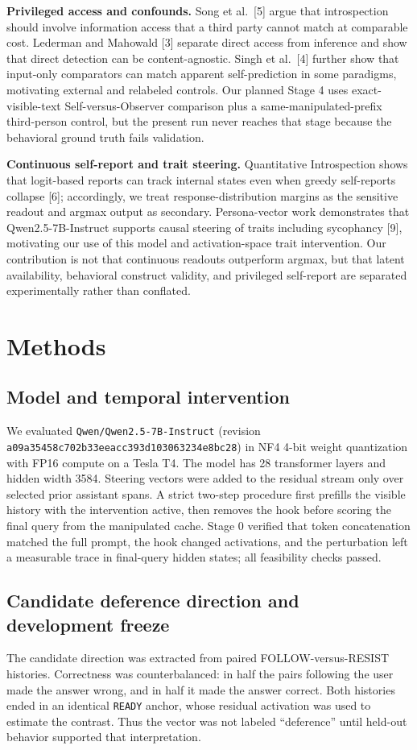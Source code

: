 \documentclass[11pt]{article}
\begin{document}
\noindent\textbf{Privileged access and confounds.} Song et al.\ [5] argue that introspection should involve information access that a third party cannot match at comparable cost. Lederman and Mahowald [3] separate direct access from inference and show that direct detection can be content-agnostic. Singh et al.\ [4] further show that input-only comparators can match apparent self-prediction in some paradigms, motivating external and relabeled controls. Our planned Stage 4 uses exact-visible-text Self-versus-Observer comparison plus a same-manipulated-prefix third-person control, but the present run never reaches that stage because the behavioral ground truth fails validation.

\noindent\textbf{Continuous self-report and trait steering.} Quantitative Introspection shows that logit-based reports can track internal states even when greedy self-reports collapse [6]; accordingly, we treat response-distribution margins as the sensitive readout and argmax output as secondary. Persona-vector work demonstrates that Qwen2.5-7B-Instruct supports causal steering of traits including sycophancy [9], motivating our use of this model and activation-space trait intervention. Our contribution is not that continuous readouts outperform argmax, but that latent availability, behavioral construct validity, and privileged self-report are separated experimentally rather than conflated.

\section{Methods}
\subsection{Model and temporal intervention}
We evaluated \texttt{Qwen/Qwen2.5-7B-Instruct} (revision \texttt{a09a35458c702b33eeacc393d103063234e8bc28}) in NF4 4-bit weight quantization with FP16 compute on a Tesla T4. The model has 28 transformer layers and hidden width 3584. Steering vectors were added to the residual stream only over selected prior assistant spans. A strict two-step procedure first prefills the visible history with the intervention active, then removes the hook before scoring the final query from the manipulated cache. Stage 0 verified that token concatenation matched the full prompt, the hook changed activations, and the perturbation left a measurable trace in final-query hidden states; all feasibility checks passed.

\subsection{Candidate deference direction and development freeze}
The candidate direction was extracted from paired FOLLOW-versus-RESIST histories. Correctness was counterbalanced: in half the pairs following the user made the answer wrong, and in half it made the answer correct. Both histories ended in an identical \texttt{READY} anchor, whose residual activation was used to estimate the contrast. Thus the vector was not labeled ``deference'' until held-out behavior supported that interpretation.
\end{document}
